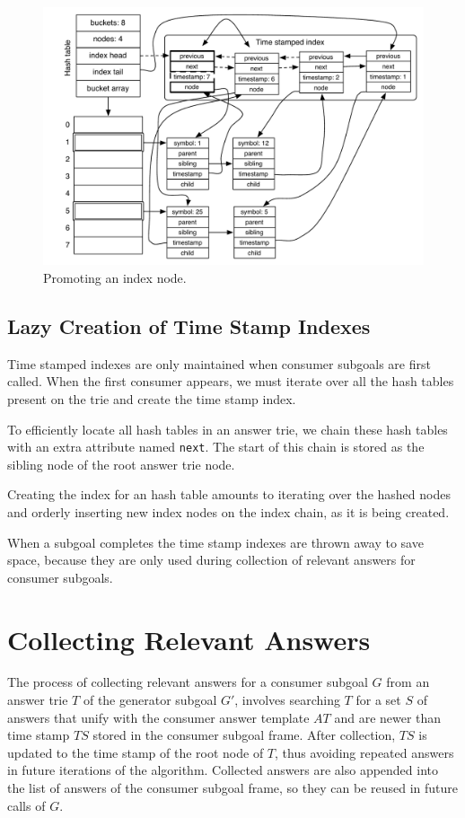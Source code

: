 \begin{figure}[ht]
  \centering
    \includegraphics[scale=0.6]{hash_table_promote.pdf}
  \caption{Promoting an index node.}
  \label{fig:hash_table_promote}
\end{figure}

\subsection{Lazy Creation of Time Stamp Indexes}

Time stamped indexes are only maintained when consumer subgoals are first called.
When the first consumer appears, we must iterate over all the hash tables present
on the trie and create the time stamp index.

To efficiently locate all hash tables in an answer trie, we chain these hash tables
with an extra attribute named \texttt{next}. The start of this chain is stored
as the sibling node of the root answer trie node.

Creating the index for an hash table amounts to iterating over the hashed nodes
and orderly inserting new index nodes on the index chain, as it is being created.

When a subgoal completes the time stamp indexes are thrown away to save space,
because they are only used during collection of relevant answers
for consumer subgoals.

\section{Collecting Relevant Answers}\label{sec:collect}

The process of collecting relevant answers for a consumer subgoal $G$ from an answer trie $T$
of the generator subgoal $G'$, involves searching $T$ for a set $S$ of answers that unify
with the consumer answer template $AT$ and are newer than time stamp
$TS$ stored in the consumer subgoal frame.
After collection, $TS$ is updated to the
time stamp of the root node of $T$, thus avoiding repeated answers in future iterations
of the algorithm. Collected answers are also appended into the list of answers of the consumer
subgoal frame, so they can be reused in future calls of $G$.

